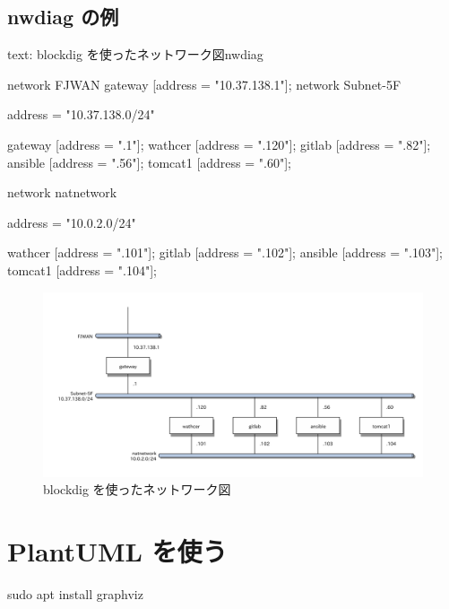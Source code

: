 \documentclass[a4j,12pt,openany,uplatex,dvipdfmx]{jsbook}
\begin{document}
\begin{center}

\end{center}





\subsection{nwdiag の例}
\label{sec:orge81b9bf}



\begin{programlist}[label={code:network-diagram-w-blockdiag-1}]{text}{: blockdig を使ったネットワーク図}nwdiag {
    network FJWAN {
        gateway [address = "10.37.138.1"];
    }
    network Subnet-5F {
        address = "10.37.138.0/24"

        gateway [address = ".1"];
        wathcer [address = ".120"];
        gitlab [address = ".82"];
        ansible [address = ".56"];
        tomcat1 [address = ".60"];
        }
    network natnetwork {
        address = "10.0.2.0/24"

        wathcer [address = ".101"];
        gitlab [address = ".102"];
        ansible [address = ".103"];
        tomcat1 [address = ".104"];
    }

}
\end{programlist}

\begin{figure}[htbp]
\centering
\includegraphics[width=.7\linewidth]{figs/nwdiag_1.pdf}
\caption{\label{fig:network-diagram-w-blockdiag-1}blockdig を使ったネットワーク図}
\end{figure}





\section{PlantUML を使う}
\label{sec:org2a06530}

sudo apt install graphviz
\end{document}
